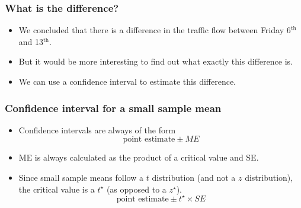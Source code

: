 
\begin{frame}
\frametitle{What is the difference?}

\begin{itemize}

\item We concluded that there is a difference in the traffic flow between Friday 6$^{\text{th}}$ and 13$^{\text{th}}$.

\pause

\item But it would be more interesting to find out what exactly this difference is.

\pause

\item We can use a confidence interval to estimate this difference.

\end{itemize}

\end{frame}


\begin{frame}
\frametitle{Confidence interval for a small sample mean}

\begin{itemize}

\item Confidence intervals are always of the form
\[ \text{point estimate} \pm {ME} \]

\pause

\item ME is always calculated as the product of a critical value and SE.

\pause

\item Since small sample means follow a $t$ distribution (and not a $z$ distribution), the critical value is a $t^\star$ (as opposed to a $z^\star$).
\[ \text{point estimate} \pm t^{\star} \times SE \]

\end{itemize}

\end{frame}


